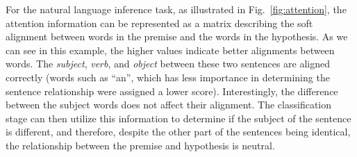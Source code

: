 For the natural language inference task, as illustrated in Fig.~\ref{fig:attention}, the attention information can be represented as a matrix describing the soft alignment between words in the premise and the words in the hypothesis. As we can see in this example, the higher values indicate better alignments between words. The \emph{subject}, \emph{verb}, and \emph{object} between these two sentences are aligned correctly (words such as ``an'', which has less importance in determining the sentence relationship were assigned a lower score). Interestingly, the difference between the subject words does not affect their alignment. The classification stage can then utilize this information to determine if the subject of the sentence is different, and therefore, despite the other part of the sentences being identical, the relationship between the premise and hypothesis is neutral.

